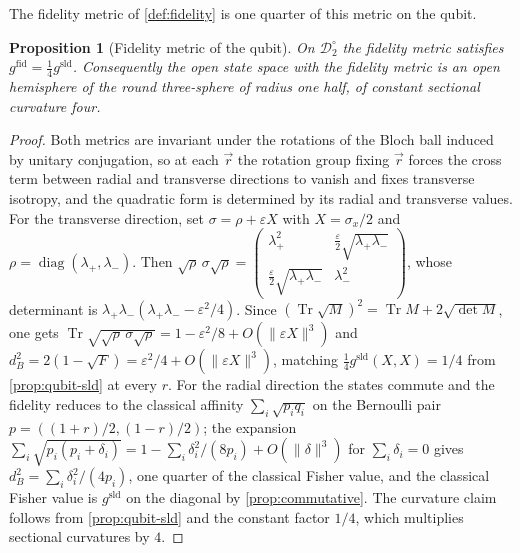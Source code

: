 \documentclass[11pt,letterpaper]{article}
\newtheorem{proposition}[theorem]{Proposition}
\theoremstyle{definition}
\theoremstyle{remark}
\begin{document}
The fidelity metric of \cref{def:fidelity} is one quarter of this metric on the qubit.

\begin{proposition}[Fidelity metric of the qubit]
\label{prop:qubit-fid}
On $\mathcal{D}_2^{\circ}$ the fidelity metric satisfies $g^{\mathrm{fid}} = \tfrac{1}{4} g^{\mathrm{sld}}$. Consequently the open state space with the fidelity metric is an open hemisphere of the round three-sphere of radius one half, of constant sectional curvature four.
\end{proposition}

\begin{proof}
Both metrics are invariant under the rotations of the Bloch ball induced by unitary conjugation, so at each $\vec{r}$ the rotation group fixing $\vec{r}$ forces the cross term between radial and transverse directions to vanish and fixes transverse isotropy, and the quadratic form is determined by its radial and transverse values. For the transverse direction, set $\sigma = \rho + \varepsilon X$ with $X = \sigma_x/2$ and $\rho = \operatorname{diag}(\lambda_+, \lambda_-)$. Then $\sqrt{\rho}\, \sigma \sqrt{\rho} = \left(\begin{smallmatrix} \lambda_+^2 & \tfrac{\varepsilon}{2}\sqrt{\lambda_+ \lambda_-} \\ \tfrac{\varepsilon}{2}\sqrt{\lambda_+ \lambda_-} & \lambda_-^2 \end{smallmatrix}\right)$, whose determinant is $\lambda_+ \lambda_- (\lambda_+ \lambda_- - \varepsilon^2/4)$. Since $(\operatorname{Tr}\sqrt{M})^2 = \operatorname{Tr} M + 2\sqrt{\det M}$, one gets $\operatorname{Tr}\sqrt{\sqrt{\rho}\,\sigma\sqrt{\rho}} = 1 - \varepsilon^2/8 + O(\|\varepsilon X\|^3)$ and $d_B^2 = 2(1 - \sqrt{F}) = \varepsilon^2/4 + O(\|\varepsilon X\|^3)$, matching $\tfrac{1}{4} g^{\mathrm{sld}}(X, X) = 1/4$ from \cref{prop:qubit-sld} at every $r$. For the radial direction the states commute and the fidelity reduces to the classical affinity $\sum_i \sqrt{p_i q_i}$ on the Bernoulli pair $p = ((1+r)/2, (1-r)/2)$; the expansion $\sum_i \sqrt{p_i (p_i + \delta_i)} = 1 - \sum_i \delta_i^2 / (8 p_i) + O(\|\delta\|^3)$ for $\sum_i \delta_i = 0$ gives $d_B^2 = \sum_i \delta_i^2 / (4 p_i)$, one quarter of the classical Fisher value, and the classical Fisher value is $g^{\mathrm{sld}}$ on the diagonal by \cref{prop:commutative}. The curvature claim follows from \cref{prop:qubit-sld} and the constant factor $1/4$, which multiplies sectional curvatures by $4$.
\end{proof}
\end{document}
